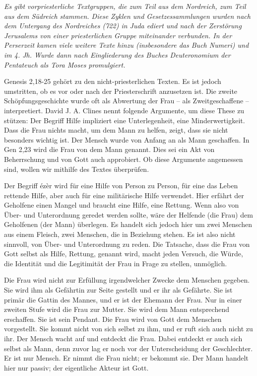 \begin{center}
\textit{\color{gray}\glqq Es gibt vorpriesterliche Textgruppen, die zum Teil aus dem Nordreich, zum Teil aus dem Südreich stammen. Diese Zyklen und Gesetzessammlungen wurden nach dem Untergang des Nordreiches (722) in Juda ediert und nach der Zerstörung Jerusalems von einer priesterlichen Gruppe miteinander verbunden. In der Perserzeit kamen viele weitere Texte hinzu (insbesondere das Buch Numeri) und im
4. Jh. Wurde dann nach Eingliederung des Buches Deuteronomium der Pentateuch als Tora Moses promulgiert.\grqq
}
\end{center}

Genesis 2,18-25 gehört zu den nicht-priesterlichen Texten. Es ist jedoch umstritten, ob es vor oder nach der Priesterschrift anzusetzen ist. Die zweite Schöpfungsgeschichte wurde oft als Abwertung der Frau – als Zweitgeschaffene – interpretiert. David J. A. Clines nennt folgende Argumente, um diese These zu stützen: Der Begriff Hilfe impliziert eine Unterlegenheit, eine Minderwertigkeit. Dass die Frau nichts macht, um dem Mann zu helfen, zeigt, dass sie nicht besonders wichtig ist. Der Mensch wurde von Anfang an als Mann geschaffen. In Gen 2,23 wird die Frau von dem Mann genannt. Dies sei ein Akt von Beherrschung und von Gott auch approbiert. Ob diese Argumente angemessen sind, wollen wir mithilfe des Textes überprüfen.

Der Begriff ézèr wird für eine Hilfe von Person zu Person, für eine das Leben rettende Hilfe, aber auch für eine militärische Hilfe verwendet. Hier erfährt der Geholfene einen Mangel und braucht eine Hilfe, eine Rettung. Wenn also von Über- und Unterordnung geredet werden sollte, wäre der Helfende (die Frau) dem Geholfenen (der Mann) überlegen. Es handelt sich jedoch hier um zwei Menschen aus einem Fleisch, zwei Menschen, die in Beziehung stehen. Es ist also nicht sinnvoll, von Über- und Unterordnung zu reden. Die Tatsache, dass die Frau von Gott selbst als Hilfe, Rettung, genannt wird, macht jeden Versuch, die Würde, die Identität und die Legitimität der Frau in Frage zu stellen, unmöglich.

Die Frau wird nicht zur Erfüllung irgendwelcher Zwecke dem Menschen gegeben. Sie wird ihm als Gefährtin zur Seite gestellt und er ihr als Gefährte. Sie ist primär die Gattin des Mannes, und er ist der Ehemann der Frau. Nur in einer zweiten Stufe wird die Frau zur Mutter. Sie wird dem Mann entsprechend erschaffen. Sie ist sein Pendant. Die Frau wird von Gott dem Menschen vorgestellt. Sie kommt nicht von sich selbst zu ihm, und er ruft sich auch nicht zu ihr. Der Mensch wacht auf und entdeckt die Frau. Dabei entdeckt er auch sich selbst als Mann, denn zuvor lag er noch vor der Unterscheidung der Geschlechter. Er ist nur Mensch. Er nimmt die Frau nicht; er bekommt sie. Der Mann handelt hier nur passiv; der eigentliche Akteur ist Gott.

